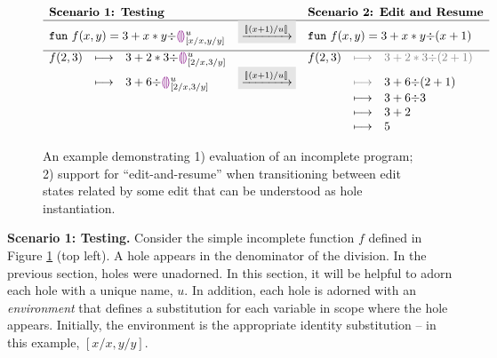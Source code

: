 \begin{figure}[ht]
\center
\small
\ensuremath{
\begin{array}{rclcrcl}
\multicolumn{3}{l}{\textbf{\ScenerioOne: Testing}}
&
&
\multicolumn{3}{l}{\textbf{\ScenerioTwo: Edit and Resume}}
\\
\hline
\multicolumn{3}{l}{\texttt{fun}~f(x,y) = 3 + x * y {\div} \hehole{}^\metavar_{[x/x,y/y]}}
&
\multicolumn{1}{l}{
\colorbox{dVeryFaint}{$\xrightarrow{[\!| (x+1) / u |\!]}$}
}
&
\multicolumn{3}{l}{\texttt{fun}~f(x,y) = 3 + x * y {\div} (x+1)}
\\[2mm]
\hline
f(2,3) &\longmapsto & 3 + 2 * 3 {\div} \hehole{}^\metavar_{[2/x, 3/y]}
&
&
f(2,3) &{\color{gray} \longmapsto} & {\color{gray} 3 + 2 * 3 {\div} (2+1)}
\\
&\longmapsto& 3 + 6 {\div} \hehole{}^\metavar_{[2/x, 3/y]}
&
\multicolumn{1}{l}{
\colorbox{dVeryFaint}{$\xrightarrow{[\!| (x+1) / u |\!]}$}
}
&& {\color{gray} \longmapsto} & 3 + 6 {\div} (2 + 1)
\\
&&
&&& \longmapsto& 3 + 6 {\div} 3
\\
&&
&&& \longmapsto& 3 + 2
\\
&&
&&& \longmapsto& 5
\end{array}
}
\caption{An example demonstrating 1) evaluation of an incomplete program; 2) support for ``edit-and-resume'' when transitioning between edit states related by some edit that can be understood as hole instantiation.}
\label{fig:dynamics}
\end{figure}

\noindent\textbf{Scenario 1: Testing.} Consider the simple incomplete function $f$ defined in Figure \ref{fig:dynamics} (top left).  
%
A hole appears in the denominator of the division. In the previous section,
holes were unadorned. In this section, it will be helpful to adorn each hole with a unique name, $u$. In addition, each hole is adorned with an \emph{environment} that defines a substitution for each variable in scope
where the hole appears. Initially, the environment is the appropriate identity substitution -- in this example, $[x/x, y/y]$. 

